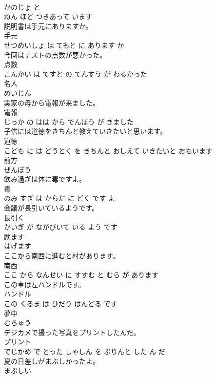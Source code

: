 \documentclass[8pt]{extreport}
\begin{document}
\begin{CJK}{UTF8}{min}
\\	かのじょ と 
\\	ねん ほど つきあって います			
\\	説明書は手元にありますか。	
\\	手元 
\\	せつめいしょ は てもと に あります か			
\\	今回はテストの点数が悪かった。	
\\	点数 
\\	こんかい は てすと の てんすう が わるかった			
\\	名人	
\\	めいじん			
\\	実家の母から電報が来ました。	
\\	電報 
\\	じっか の はは から でんぽう が きました			
\\	子供には道徳をきちんと教えていきたいと思います。	
\\	道徳 
\\	こども に は どうとく を きちんと おしえて いきたいと おもいます			
\\	前方	
\\	ぜんぽう			
\\	飲み過ぎは体に毒ですよ。	
\\	毒 
\\	のみ すぎ は からだ に どく です よ			
\\	会議が長引いているようです。	
\\	長引く 
\\	かいぎ が ながびいて いる よう です			
\\	励ます	
\\	はげます			
\\	ここから南西に進むと村があります。	
\\	南西 
\\	ここ から なんせい に すすむ と むら が あります			
\\	この車は左ハンドルです。	
\\	ハンドル 
\\	この くるま は ひだり はんどる です			
\\	夢中	
\\	むちゅう			
\\	デジカメで撮った写真をプリントしたんだ。	
\\	プリント 
\\	でじかめ で とった しゃしん を ぷりんと した ん だ			
\\	夏の日差しがまぶしかったよ。	
\\	まぶしい 

\end{CJK}
\end{document}
